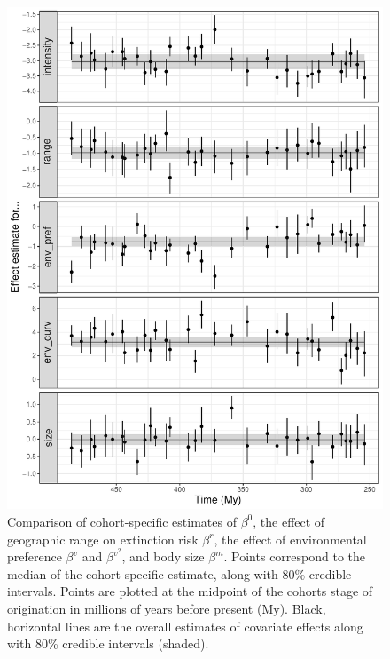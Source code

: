 \documentclass[11pt]{article}
\begin{document}
\begin{figure}[ht]
  \centering
  \includegraphics[width = \textwidth,height = 0.7\textheight,keepaspectratio=true]{figure/cohort_series_cweib_cens}
  \caption{Comparison of cohort-specific estimates of \(\beta^{0}\), the effect of geographic range on extinction risk \(\beta^{r}\), the effect of environmental preference \(\beta^{v}\) and \(\beta^{v^{2}}\), and body size \(\beta^{m}\). Points correspond to the median of the cohort-specific estimate, along with 80\% credible intervals. Points are plotted at the midpoint of the cohorts stage of origination in millions of years before present (My). Black, horizontal lines are the overall estimates of covariate effects along with 80\% credible intervals (shaded).}
  \label{fig:cohort_series}
\end{figure}
\end{document}
